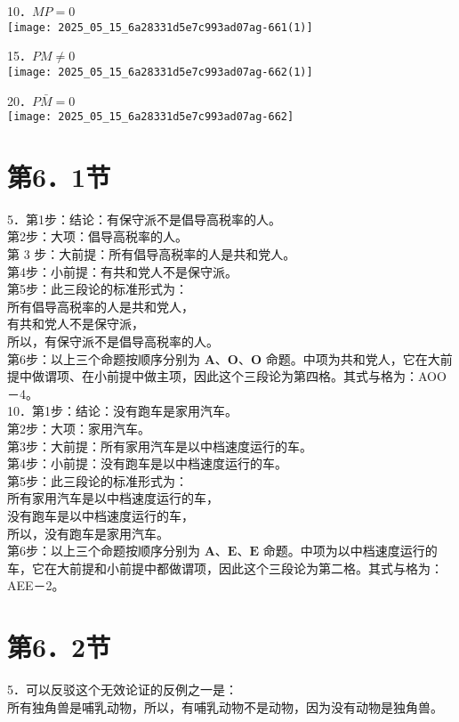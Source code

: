 10．$M P=0$\\
\texttt{[image: 2025\_05\_15\_6a28331d5e7c993ad07ag-661(1)]}

15．$P M \neq 0$\\
\texttt{[image: 2025\_05\_15\_6a28331d5e7c993ad07ag-662(1)]}

20．$P \bar{M}=0$\\
\texttt{[image: 2025\_05\_15\_6a28331d5e7c993ad07ag-662]}

\section*{第6．1节}
5．第1步：结论：有保守派不是倡导高税率的人。\\
第2步：大项：倡导高税率的人。\\
第 3 步：大前提：所有倡导高税率的人是共和党人。\\
第4步：小前提：有共和党人不是保守派。\\
第5步：此三段论的标准形式为：\\
所有倡导高税率的人是共和党人，\\
有共和党人不是保守派，\\
所以，有保守派不是倡导高税率的人。\\
第6步：以上三个命题按顺序分别为 $\mathbf{A} 、 \mathbf{O} 、 \mathbf{O}$ 命题。中项为共和党人，它在大前提中做谓项、在小前提中做主项，因此这个三段论为第四格。其式与格为：AOO－4。\\
10．第1步：结论：没有跑车是家用汽车。\\
第2步：大项：家用汽车。\\
第3步：大前提：所有家用汽车是以中档速度运行的车。\\
第4步：小前提：没有跑车是以中档速度运行的车。\\
第5步：此三段论的标准形式为：\\
所有家用汽车是以中档速度运行的车，\\
没有跑车是以中档速度运行的车，\\
所以，没有跑车是家用汽车。\\
第6步：以上三个命题按顺序分别为 $\mathbf{A} 、 \mathbf{E} 、 \mathbf{E}$ 命题。中项为以中档速度运行的车，它在大前提和小前提中都做谓项，因此这个三段论为第二格。其式与格为：AEE－2。

\section*{第6．2节}
5．可以反驳这个无效论证的反例之一是：\\
所有独角兽是哺乳动物，所以，有哺乳动物不是动物，因为没有动物是独角兽。


